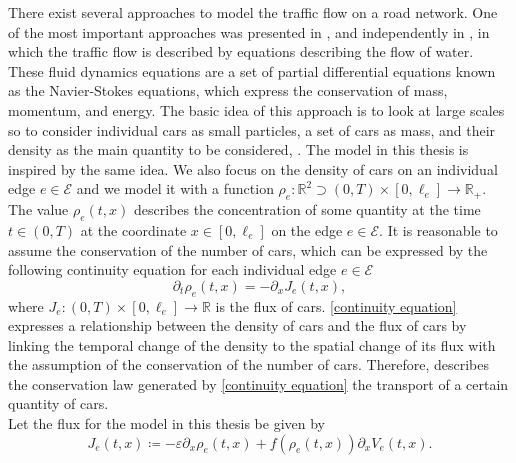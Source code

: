There exist several approaches to model the traffic flow on a road network. One of the most important approaches was presented in \cite{LighthillWhitham:1955}, and independently in \cite{Richards:1956}, in which the traffic flow is described by equations describing the flow of water. These fluid dynamics equations are a set of partial differential equations known as the Navier-Stokes equations, which express the conservation of mass, momentum, and energy. The basic idea of this approach is to look at large scales so to consider individual cars as small particles, a set of cars as mass, and their density as the main quantity to be considered, \cite[p.~1]{GaravelloPiccoli:2006}. The model in this thesis is inspired by the same idea. We also focus on the density of cars on an individual edge $e \in \mathcal{E}$ and we model it with a function $\rho_e \colon \mathbb{R}^2 \supset (0, T) \times [0, \ell_e] \to \mathbb{R}_{+}$. The value $\rho_e (t,x)$ describes the concentration of some quantity at the time $t \in (0, T)$ at the coordinate $x \in [0, \ell_e]$ on the edge $e \in \mathcal{E}$. It is reasonable to assume the conservation of the number of cars, which can be expressed by the following continuity equation for each individual edge $e \in \mathcal{E}$
\begin{equation}
    \label{continuity equation}
    \partial_t \rho_e (t,x) = - \partial_x J_e(t,x),
\end{equation}
where $J_e \colon (0,T) \times [0, \ell_e] \to \mathbb{R}$ is the flux of cars. \cref{continuity equation} expresses a relationship between the density of cars and the flux of cars by linking the temporal change of the density to the spatial change of its flux with the assumption of the conservation of the number of cars. Therefore, describes the conservation law generated by \cref{continuity equation} the transport of a certain quantity of cars. \\
Let the flux for the model in this thesis be given by 
\begin{equation} 
    \label{eq:flux} 
    J_e(t,x) \coloneqq - \varepsilon \partial_x \rho_e (t, x) + f(\rho_e(t, x)) \partial_x V_e(t, x).
\end{equation}
